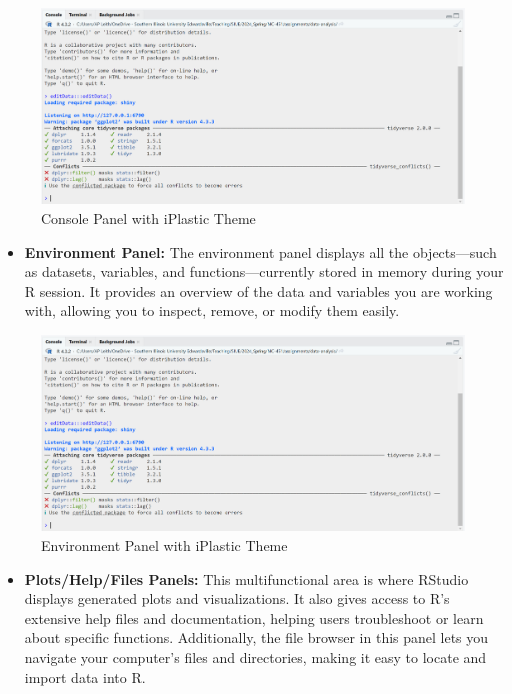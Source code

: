 \documentclass[
]{book}
\providecommand{\tightlist}{%
  \setlength{\itemsep}{0pt}\setlength{\parskip}{0pt}}
\begin{document}
\begin{figure}
\centering
\includegraphics[width=1\textwidth,height=\textheight]{images/console-panel.png}
\caption{Console Panel with iPlastic Theme}
\end{figure}

\begin{itemize}
\tightlist
\item
  \textbf{Environment Panel:} The environment panel displays all the objects---such as datasets, variables, and functions---currently stored in memory during your R session. It provides an overview of the data and variables you are working with, allowing you to inspect, remove, or modify them easily.
\end{itemize}

\begin{figure}
\centering
\includegraphics[width=1\textwidth,height=\textheight]{images/environment-panel.png}
\caption{Environment Panel with iPlastic Theme}
\end{figure}

\begin{itemize}
\tightlist
\item
  \textbf{Plots/Help/Files Panels:} This multifunctional area is where RStudio displays generated plots and visualizations. It also gives access to R's extensive help files and documentation, helping users troubleshoot or learn about specific functions. Additionally, the file browser in this panel lets you navigate your computer's files and directories, making it easy to locate and import data into R.
\end{itemize}
\end{document}
